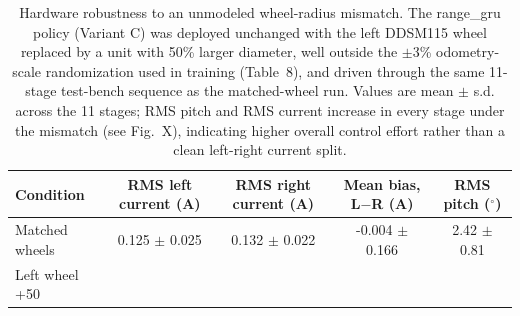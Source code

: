 \begin{table}[H]
\caption{Hardware robustness to an unmodeled wheel-radius mismatch. The range\_gru policy (Variant C) was deployed unchanged with the left DDSM115 wheel replaced by a unit with 50\% larger diameter, well outside the $\pm$3\% odometry-scale randomization used in training (Table~8), and driven through the same 11-stage test-bench sequence as the matched-wheel run. Values are mean $\pm$ s.d. across the 11 stages; RMS pitch and RMS current increase in every stage under the mismatch (see Fig.~X), indicating higher overall control effort rather than a clean left-right current split.}
\begin{tabularx}{\textwidth}{Xcccc}
\toprule
Condition & RMS left current (A) & RMS right current (A) & Mean bias, L$-$R (A) & RMS pitch ($^\circ$) \\
\midrule
Matched wheels & 0.125 $\pm$ 0.025 & 0.132 $\pm$ 0.022 & -0.004 $\pm$ 0.166 & 2.42 $\pm$ 0.81 \\
Left wheel +50%
\bottomrule
\end{tabularx}
\label{tab:hw-wheel-mismatch}
\end{table}
